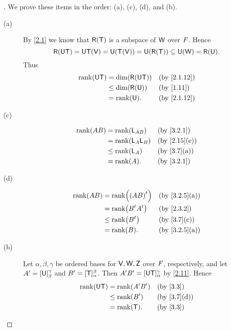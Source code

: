 \begin{proof}[]
  We prove these items in the order:
  (a), (c), (d), and (b).
  \begin{description}
    \item[(a)]
      By \cref{2.1} we know that \(\rg{\T}\) is a subspace of \(\mathsf{W}\) over \(\mathit{F}\).
      Hence
      \[
        \rg{\U \T} = \U \T(\V) = \U(\T(\V)) = \U(\rg{\T}) \subseteq \U(\W) = \rg{\U}.
      \]
      Thus
      \begin{align*}
        \rk{\U \T} & = \dim(\rg{\U \T}) &  & \text{(by \cref{2.1.12})} \\
                   & \leq \dim(\rg{\U}) &  & \text{(by \cref{1.11})}   \\
                   & = \rk{\U}.         &  & \text{(by \cref{2.1.12})}
      \end{align*}
    \item[(c)]
      \begin{align*}
        \rk{AB} & = \rk{\L_{AB}}   &  & \text{(by \cref{3.2.1})}   \\
                & = \rk{\L_A \L_B} &  & \text{(by \cref{2.15}(e))} \\
                & \leq \rk{\L_A}   &  & \text{(by \cref{3.7}(a))}  \\
                & = \rk{A}.        &  & \text{(by \cref{3.2.1})}
      \end{align*}
    \item[(d)]
      \begin{align*}
        \rk{AB} & = \rk{\tp{(AB)}}     &  & \text{(by \cref{3.2.5}(a))} \\
                & = \rk{\tp{B} \tp{A}} &  & \text{(by \cref{2.3.2})}    \\
                & \leq \rk{\tp{B}}     &  & \text{(by \cref{3.7}(c))}   \\
                & = \rk{B}.            &  & \text{(by \cref{3.2.5}(a))}
      \end{align*}
    \item[(b)]
      Let \(\alpha, \beta, \gamma\) be ordered bases for \(\mathsf{V}, \mathsf{W}, \mathsf{Z}\) over \(\mathit{F}\), respectively, and let \(A' = [\mathsf{U}]_{\beta}^{\gamma}\) and \(B' = [\mathsf{T}]_{\alpha}^{\beta}\).
      Then \(A' B' = [\mathsf{U} \mathsf{T}]_{\alpha}^{\gamma}\) by \cref{2.11}.
      Hence
      \begin{align*}
        \rk{\U \T} & = \rk{A' B'} &  & \text{(by \cref{3.3})}    \\
                   & \leq \rk{B'} &  & \text{(by \cref{3.7}(d))} \\
                   & = \rk{\T}.   &  & \text{(by \cref{3.3})}
      \end{align*}
  \end{description}
\end{proof}

